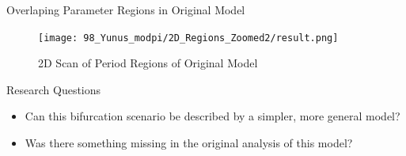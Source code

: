 \begin{frame}{Overlaping Parameter Regions in Original Model}
    \begin{figure}
        \centering
        \texttt{[image: 98\_Yunus\_modpi/2D\_Regions\_Zoomed2/result.png]}
        \caption{2D Scan of Period Regions of Original Model}
    \end{figure}
\end{frame}

\begin{frame}{Research Questions}
    \begin{itemize}
        \item Can this bifurcation scenario be described by a simpler, more general model?
        \item Was there something missing in the original analysis of this model?
    \end{itemize}
\end{frame}
